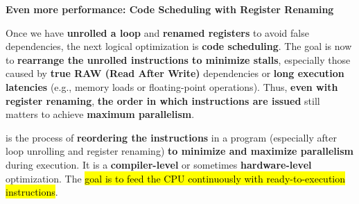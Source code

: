 \begin{flushleft}
    \textcolor{Green3}{ \textbf{Even more performance: Code Scheduling with Register Renaming}}
\end{flushleft}
Once we have \textbf{unrolled a loop} and \textbf{renamed registers} to avoid false dependencies, the next logical optimization is \textbf{code scheduling}. The goal is now to \textbf{rearrange the unrolled instructions to minimize stalls}, especially those caused by \textbf{true RAW (Read After Write)} dependencies or \textbf{long execution latencies} (e.g., memory loads or floating-point operations). Thus, \textbf{even with register renaming}, \textbf{the order in which instructions are issued} still matters to achieve \textbf{maximum parallelism}.

\highspace
{} is the process of \textbf{reordering the instructions} in a program (especially after loop unrolling and register renaming) \textbf{to minimize and maximize parallelism} during execution. It is a \textbf{compiler-level} or sometimes \textbf{hardware-level} optimization. The \hl{goal is to feed the CPU continuously with ready-to-execution instructions}.


